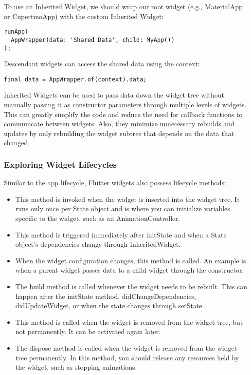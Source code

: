 \noindent To use an Inherited Widget, we should wrap our root widget (e.g., MaterialApp or CupertinoApp) with the custom 
Inherited Widget:

\begin{lstlisting}
runApp(
  AppWrapper(data: 'Shared Data', child: MyApp())
);
\end{lstlisting}

\noindent Descendant widgets can access the shared data using the context:

\begin{lstlisting}
final data = AppWrapper.of(context).data;
\end{lstlisting}

\noindent Inherited Widgets can be used to pass data down the widget tree without manually passing it as constructor 
parameters through multiple levels of widgets. This can greatly simplify the code and reduce the need for callback 
functions to communicate between widgets. Also, they minimize unnecessary rebuilds and updates by only rebuilding the 
widget subtree that depends on the data that changed.


\newpage
\subsubsection{Exploring Widget Lifecycles}

Similar to the app lifecycle, Flutter widgets also possess lifecycle methods:

\begin{itemize}
  \item {} This method is invoked when the widget is inserted into the widget tree. It runs only once per 
  State object and is where you can initialize variables specific to the widget, such as an AnimationController.

  \item {} This method is triggered immediately after initState and when a State object's 
  dependencies change through InheritedWidget.

  \item {} When the widget configuration changes, this method is called. An example is when a 
  parent widget passes data to a child widget through the constructor.

  \item {} The build method is called whenever the widget needs to be rebuilt. This can happen after the 
  initState method, didChangeDependencies, didUpdateWidget, or when the state changes through setState.

  \item {} This method is called when the widget is removed from the widget tree, but not permanently. 
  It can be activated again later.

  \item {} The dispose method is called when the widget is removed from the widget tree permanently. 
  In this method, you should release any resources held by the widget, such as stopping animations.
\end{itemize}

